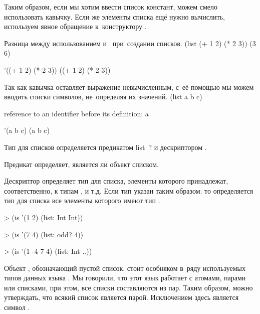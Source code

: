 Таким образом, если мы хотим ввести список констант, можем смело использовать кавычку. Если же элементы списка ещё нужно вычислить, используем явное обращение к~конструктору .

\begin{example}{Разница между использованием  и~ при~создании списков.}
\REPL
  {(list (+ 1 2) (* 2 3))}
  {(3 6)}

\REPL
  {'((+ 1 2) (* 2 3))}
  {((+ 1 2) (* 2 3))}
\end{example}

\begin{example}{Так как кавычка оставляет выражение невычисленным, с~её помощью мы можем вводить списки символов, не~определяя их значений.}
\REPLin
  {(list a b c)}

{\errorstyle reference to an identifier before its definition: a}

\REPL
  {'(a b c)}
  {(a b c)}
\end{example}

Тип для списков определяется предикатом \si{list?} и дескриптором .

\begin{example}{Предикат  определяет, является ли объект списком.}
\end{example}

\begin{example}{Дескриптор  определяет тип для списка, элементы которого принадлежат, соответственно, к типам ,  и т.д. Если тип указан таким образом:  то определяется тип для списка все элементы которого имеют тип .}
\begin{ExampleCode}
> (is '(1 2) 
      (list: Int Int))
\end{ExampleCode}
\begin{ExampleCode}
> (is '(7 4) 
      (list: odd? 4))
\end{ExampleCode}
\begin{ExampleCode}
> (is '(1 -4 7 4) 
      (list: Int ..))
\end{ExampleCode}
\end{example}

%
Объект , обозначающий пустой список, стоит особняком в~ряду используемых типов данных языка \Scheme. Мы говорили, что этот язык работает с атомами, парами или списками, при этом, все списки составляются из пар. Таким образом, можно утверждать, что всякий список является парой. Исключением здесь является символ .

